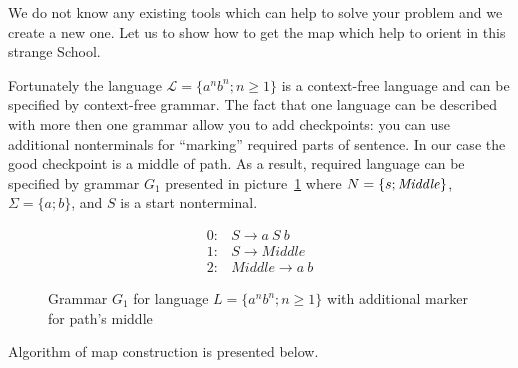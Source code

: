 We do not know any existing tools which can help to solve your problem and we create a new one.
Let us to show how to get the map which help to orient in this strange School.

Fortunately the language $\mathcal{L} = \{a^n b^n; n \geq 1\}$ is a context-free language and can be specified by context-free grammar. 
The fact that one language can be described with more then one grammar allow you to add checkpoints: you can use additional nonterminals for ``marking'' required parts of sentence.
In our case the good checkpoint is a middle of path.
As a result, required language can be specified by grammar $G_1$ presented in picture~\ref{grammarG} where $N = \{s; \text{\textit{Middle}}\}$, $\Sigma = \{a; b\}$, and $S$ is a start nonterminal.

\begin{figure}[h]
   \begin{center}
   \[
\begin{array}{rl}
   0:& S \rightarrow a \ S \ b \\
   1:& S \rightarrow Middle \\
   2:& Middle \rightarrow a \ b
\end{array}
\]

   \caption{Grammar $G_1$ for language $L=\{a^n b^n; n \geq 1\}$ with additional marker for path's middle}
   \label{grammarG}        
   \end{center}
\end{figure}

Algorithm of map construction is presented below.
